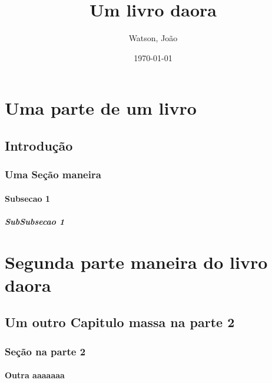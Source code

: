 \documentclass[a4paper, 12pt]{book}
\title{Um livro daora}
\author{Watson, João}
\date{\today}
\begin{document}
    \maketitle
    \part{Uma parte de um livro}
    \chapter{Introdução}
    \blindtext[3]
    \section{Uma Seção maneira}
    \blindtext[1]
    \blindenumerate
    \subsection{Subsecao 1}
    \blindtext[2]
    \subsubsection{SubSubsecao 1}
    \blindtext[2]
    \part{Segunda parte maneira do livro daora}
    \chapter{Um outro Capitulo massa na parte 2}
    \section{Seção na parte 2}
    \blindtext[1]
    \blinddescription
    \subsection{Outra aaaaaaa}
    \blindmathpaper
\end{document}

